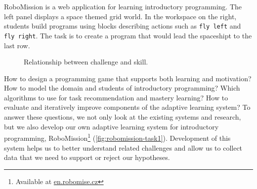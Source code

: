 %
  {RoboMission is a web application for learning introductory programming.
   The left panel displays a space themed grid world. In the workspace on
   the right, students build programs using blocks describing actions
   such as \texttt{fly left} and \texttt{fly right}.
   The task is to create a program that would lead the spaceshipt to the last row.}




\begin{figure}[htb]
  \centering
  \caption{Relationship between challenge and skill.}
  \label{fig:flow}
\end{figure}


How to design a programming game that supports both learning and motivation?
How to model the domain and students of introductory programming?
Which algorithms to use for task recommendation and mastery learning?
How to evaluate and iteratively improve components of the adaptive learning system?
To answer these questions, we not only look at the existing systems
and research, but we also develop our own adaptive learning system for
introductory programming, RoboMission\footnote{Available at \url{en.robomise.cz}}
(\cref{fig:robomission-task1}).
Development of this system helps us to better understand related challenges
and allow us to collect data that we need to support or reject our hypotheses.


